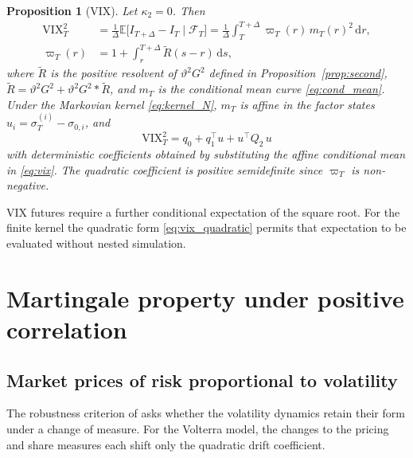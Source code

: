 \documentclass[11pt,a4paper]{article}
\newtheorem{proposition}[theorem]{Proposition}
\theoremstyle{definition}
\newcommand{\D}{\mathrm{d}}
\newcommand{\E}{\mathbb{E}}
\newcommand{\F}{\mathcal{F}}
\newcommand{\VIX}{\mathrm{VIX}}
\begin{document}
\begin{proposition}[VIX]\label{prop:vix}
Let $\kappa_2=0$. Then
\begin{equation}\label{eq:vix}
\begin{split}
\VIX_T^2&=\frac1\Delta\E\big[I_{T+\Delta}-I_T\mid\F_T\big]=\frac1\Delta\int_T^{T+\Delta}\varpi_T(r)\,m_T(r)^2\,\D r,\\
\varpi_T(r)&=1+\int_r^{T+\Delta}\widetilde R(s-r)\,\D s ,
\end{split}
\end{equation}
where $\widetilde R$ is the positive resolvent of $\vartheta^2G^2$ defined in Proposition~\ref{prop:second}, $\widetilde R=\vartheta^2G^2+\vartheta^2G^2*\widetilde R$, and $m_T$ is the conditional mean curve \eqref{eq:cond_mean}. Under the Markovian kernel \eqref{eq:kernel_N}, $m_T$ is affine in the factor states $u_i=\sigma^{(i)}_T-\sigma_{0,i}$, and
\begin{equation}\label{eq:vix_quadratic}
\VIX_T^2=q_0+q_1^\top u+u^\top Q_2\,u
\end{equation}
with deterministic coefficients obtained by substituting the affine conditional mean in \eqref{eq:vix}. The quadratic coefficient is positive semidefinite since $\varpi_T$ is non-negative.
\end{proposition}

VIX futures require a further conditional expectation of the square root. For the finite kernel the quadratic form \eqref{eq:vix_quadratic} permits that expectation to be evaluated without nested simulation.
\section{Martingale property under positive correlation}\label{sec:measure}

\subsection{Market prices of risk proportional to volatility}

The robustness criterion of \citet{SeppRakhmonov2026} asks whether the volatility dynamics retain their form under a change of measure. For the Volterra model, the changes to the pricing and share measures each shift only the quadratic drift coefficient.
\end{document}
